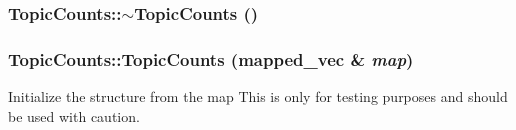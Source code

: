 \label{struct_topic_counts_a999dc787d880d568be9f5c8475fea998}
\hypertarget{struct_topic_counts_aa57464ff14acfe74e7d402bc9b3af6aa}{
\subsubsection[{$\sim$TopicCounts}]{\setlength{\rightskip}{0pt plus 5cm}TopicCounts::$\sim$TopicCounts ()}}
\label{struct_topic_counts_aa57464ff14acfe74e7d402bc9b3af6aa}
\hypertarget{struct_topic_counts_aafbb66681d6b34ac5c272a2d38f4ddcb}{
\subsubsection[{TopicCounts}]{\setlength{\rightskip}{0pt plus 5cm}TopicCounts::TopicCounts ({\bf mapped\_\-vec} \& {\em map})}}
\label{struct_topic_counts_aafbb66681d6b34ac5c272a2d38f4ddcb}
Initialize the structure from the map This is only for testing purposes and should be used with caution. 

